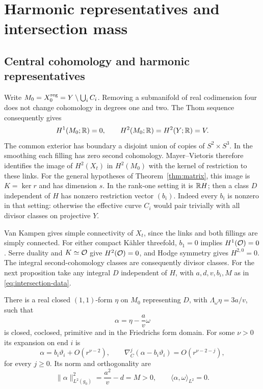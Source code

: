 \section{Harmonic representatives and intersection mass}\label{sec:mass}

\subsection{Central cohomology and harmonic representatives}
Write $M_0=X_0^{\mathrm{reg}}=Y\setminus\bigcup_iC_i$. Removing a submanifold of
real codimension four does not change cohomology in degrees one and two.
The Thom sequence consequently gives
\begin{equation}\label{eq:central-cohomology}
 H^1(M_0;\mathbb R)=0,\qquad H^2(M_0;\mathbb R)=H^2(Y;\mathbb R)=V.
\end{equation}
The common exterior has boundary a disjoint union of copies of
$S^2\times S^3$. In the smoothing each filling has zero second
cohomology. Mayer--Vietoris therefore identifies the image of $H^2(X_t)$
in $H^2(M_0)$ with the kernel of restriction to these links. For the general hypotheses of Theorem~\ref{thm:matrix}, this image is
$K=\ker r$ and has dimension $s$. In the rank-one setting it is $\mathbb R H$;
then a class $D$ independent of $H$ has nonzero restriction vector $(b_i)$.
Indeed every $b_i$ is nonzero in that setting: otherwise the effective
curve $C_i$ would pair trivially with all divisor classes on projective $Y$.

Van Kampen gives simple connectivity of $X_t$, since the links and both
fillings are simply connected. For either compact K\"ahler threefold,
$b_1=0$ implies $H^1(\mathcal O)=0$. Serre duality and $K\simeq\mathcal O$ give
$H^2(\mathcal O)=0$, and Hodge symmetry gives $H^{2,0}=0$.
The integral second-cohomology classes are consequently divisor classes.
For the next proposition take any integral $D$ independent of $H$, with
$a,d,v,b_i,M$ as in \eqref{eq:intersection-data}.

\begin{proposition}\label{prop:mass}
There is a real closed $(1,1)$-form $\eta$ on $M_0$ representing $D$,
with $\Lambda_\omega\eta=3a/v$, such that
\begin{equation}\label{eq:primitive-form}
 \alpha=\eta-\frac av\omega
\end{equation}
is closed, coclosed, primitive and in the Friedrichs form domain.
For some $\nu>0$ its expansion on end $i$ is
\begin{equation}\label{eq:alpha-expansion}
 \alpha=b_i\vartheta_i+O(r^{\nu-2}),\qquad
 \nabla_C^j(\alpha-b_i\vartheta_i)=O(r^{\nu-2-j}),
\end{equation}
for every $j\ge0$. Its norm and orthogonality are
\begin{equation}\label{eq:mass-identity}
 \|\alpha\|_{L^2(g_0)}^2=\frac{a^2}{v}-d=M>0,
 \qquad \langle\alpha,\omega\rangle_{L^2}=0.
\end{equation}
\end{proposition}

